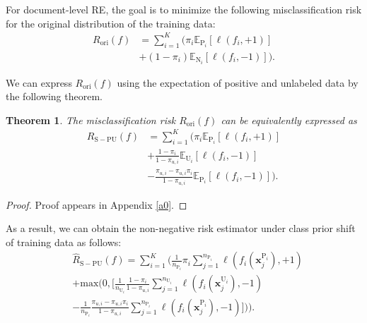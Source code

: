 \documentclass[11pt]{article}
\begin{document}
For document-level RE, the goal is to minimize the following misclassification risk for the original distribution of the training data:
\begin{equation}
\begin{aligned}\label{eq10}
R_{\mathrm{ori}}(f)&=\sum_{i=1}^{K}(\pi_{i} \mathbb{E}_{\mathrm{P}_{i}}[\ell(f_{i}, +1)]\\&+(1-\pi_{i})\mathbb{E}_{\mathrm{N}_{i}}[\ell(f_{i}, -1)]).
\end{aligned}
\end{equation}

We can express $R_{\mathrm{ori}}(f)$ using the expectation of positive and unlabeled data by the following theorem.
\newtheorem{thm}{\bf Theorem}
\begin{thm}\label{thm1}
The misclassification risk $R_{\mathrm{ori}}(f)$ can be equivalently expressed as
\begin{equation}
\begin{aligned}\label{eq11}
R_{\mathrm{S-PU}}(f)&=\sum_{i=1}^{K}(\pi_{i} \mathbb{E}_{\mathrm{P}_{i}}[ \ell(f_{i}, +1)] \\
&+\frac{1-\pi_{i}}{1-\pi_{u,i}} \mathbb{E}_{\mathrm{U}_{i}}[\ell(f_{i}, -1)] \\
&-\frac{\pi_{u,i}-\pi_{u,i} \pi_{i}}{1-\pi_{u,i}}\mathbb{E}_{\mathrm{P}_{i}}[\ell(f_{i}, -1)]).
\end{aligned}
\end{equation}
\end{thm} 
\begin{proof}
Proof appears in Appendix \ref{a0}.
\end{proof}

As a result, we can obtain the non-negative risk estimator \citep{NIPS2017_7cce53cf} under class prior shift of training data as follows:
\begin{equation}
\begin{aligned}\label{eq13}
&\widehat{R}_{\mathrm{S-PU}}(f)=\sum_{i=1}^{K}( \frac{1}{n_{\mathrm{P}_{i}}}\pi_{i} \sum_{j=1}^{n_{\mathrm{P}_{i}}}\ell(f_{i}(\boldsymbol{x}_{j}^{\mathrm{P}_{i}}), +1) \\&+\mathrm{max}(0, [\frac{1}{n_{\mathrm{U}_{i}}} \frac{1-\pi_{i}}{1-\pi_{u,i}} \sum_{j=1}^{n_{\mathrm{U}_{i}}} \ell(f_{i}(\boldsymbol{x}_{j}^{\mathrm{U}_{i}}), -1)\\&-\frac{1}{n_{\mathrm{P}_{i}}}\frac{\pi_{u,i}-\pi_{u,i} \pi_{i}}{1-\pi_{u,i}} \sum_{j=1}^{n_{\mathrm{P}_{i}}}\ell(f_{i}(\boldsymbol{x}_{j}^{\mathrm{P}_{i}}), -1)])).
\end{aligned}
\end{equation}
\end{document}
